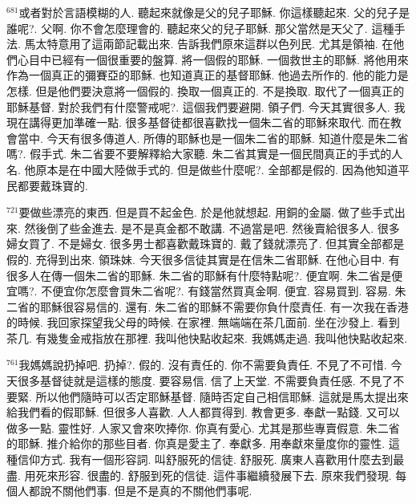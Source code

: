 \documentclass{book}
\begin{document}
$^{681}$或者對於言語模糊的人.
聽起來就像是父的兒子耶穌.
你這樣聽起來.
父的兒子是誰呢?.
父啊.
你不會怎麼理會的.
聽起來父的兒子耶穌.
那父當然是天父了.
這種手法.
馬太特意用了這兩節記載出來.
告訴我們原來這群以色列民.
尤其是領袖.
在他們心目中已經有一個很重要的盤算.
將一個假的耶穌.
一個救世主的耶穌.
將他用來作為一個真正的彌賽亞的耶穌.
也知道真正的基督耶穌.
他過去所作的.
他的能力是怎樣.
但是他們要決意將一個假的.
換取一個真正的.
不是換取.
取代了一個真正的耶穌基督.
對於我們有什麼警戒呢?.
這個我們要避開.
領子們.
今天其實很多人.
我現在講得更加準確一點.
很多基督徒都很喜歡找一個朱二省的耶穌來取代.
而在教會當中.
今天有很多傳道人.
所傳的耶穌也是一個朱二省的耶穌.
知道什麼是朱二省嗎?.
假手式.
朱二省要不要解釋給大家聽.
朱二省其實是一個民間真正的手式的人名.
他原本是在中國大陸做手式的.
但是做些什麼呢?.
全部都是假的.
因為他知道平民都要戴珠寶的.

$^{721}$要做些漂亮的東西.
但是買不起金色.
於是他就想起.
用銅的金屬.
做了些手式出來.
然後倒了些金進去.
是不是真金都不敢講.
不過當是吧.
然後賣給很多人.
很多婦女買了.
不是婦女.
很多男士都喜歡戴珠寶的.
戴了錢就漂亮了.
但其實全部都是假的.
充得到出來.
領珠妹.
今天很多信徒其實是在信朱二省耶穌.
在他心目中.
有很多人在傳一個朱二省的耶穌.
朱二省的耶穌有什麼特點呢?.
便宜啊.
朱二省是便宜嗎?.
不便宜你怎麼會買朱二省呢?.
有錢當然買真金啊.
便宜.
容易買到.
容易.
朱二省的耶穌很容易信的.
還有.
朱二省的耶穌不需要你負什麼責任.
有一次我在香港的時候.
我回家探望我父母的時候.
在家裡.
無端端在茶几面前.
坐在沙發上.
看到茶几.
有幾隻金戒指放在那裡.
我叫他快點收起來.
我媽媽走過.
我叫他快點收起來.

$^{761}$我媽媽說扔掉吧.
扔掉?.
假的.
沒有責任的.
你不需要負責任.
不見了不可惜.
今天很多基督徒就是這樣的態度.
要容易信.
信了上天堂.
不需要負責任感.
不見了不要緊.
所以他們隨時可以否定耶穌基督.
隨時否定自己相信耶穌.
這就是馬太提出來給我們看的假耶穌.
但很多人喜歡.
人人都買得到.
教會更多.
奉獻一點錢.
又可以做多一點.
靈性好.
人家又會來吹捧你.
你真有愛心.
尤其是那些專賣假意.
朱二省的耶穌.
推介給你的那些目者.
你真是愛主了.
奉獻多.
用奉獻來量度你的靈性.
這種信仰方式.
我有一個形容詞.
叫舒服死的信徒.
舒服死.
廣東人喜歡用什麼去到最盡.
用死來形容.
很盡的.
舒服到死的信徒.
這件事繼續發展下去.
原來我們發現.
每個人都說不關他們事.
但是不是真的不關他們事呢.
\end{document}
